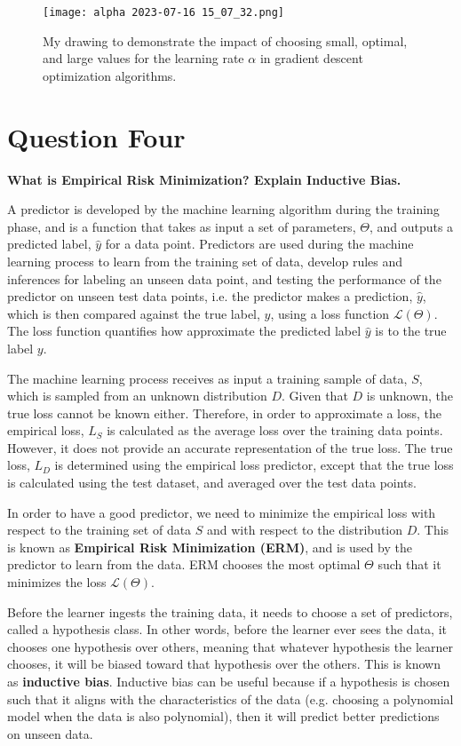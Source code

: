\documentclass{article}
\begin{document}
\begin{figure}
    \centering
    \texttt{[image: alpha 2023-07-16 15\_07\_32.png]}
    \caption{My drawing to demonstrate the impact of choosing small, optimal, and large values for the learning rate $\alpha$ in gradient descent optimization algorithms.}
    \label{alpha}
\end{figure}

\section{Question Four}
\noindent \textbf{What is Empirical Risk Minimization? Explain Inductive Bias.}

A predictor is developed by the machine learning algorithm during the training phase, and is a function that takes as input a set of parameters, $\Theta$, and outputs a predicted label, $\hat{y}$ for a data point. Predictors are used during the machine learning process to learn from the training set of data, develop rules and inferences for labeling an unseen data point, and testing the performance of the predictor on unseen test data points, i.e. the predictor makes a prediction, $\hat{y}$, which is then compared against the true label, $y$, using a loss function $\mathscr{L}(\Theta)$. The loss function quantifies how approximate the predicted label $\hat{y}$ is to the true label $y$.

The machine learning process receives as input a training sample of data, $S$, which is sampled from an unknown distribution $D$. Given that $D$ is unknown, the true loss cannot be known either. Therefore, in order to approximate a loss, the empirical loss, $L_S$ is calculated as the average loss over the training data points. However, it does not provide an accurate representation of the true loss. The true loss, $L_D$ is determined using the empirical loss predictor, except that the true loss is calculated using the test dataset, and averaged over the test data points. 

In order to have a good predictor, we need to minimize the empirical loss with respect to the training set of data $S$ and with respect to the distribution $D$. This is known as \textbf{Empirical Risk Minimization (ERM)}, and is used by the predictor to learn from the data. ERM chooses the most optimal $\Theta$ such that it minimizes the loss $\mathscr{L}(\Theta)$.

Before the learner ingests the training data, it needs to choose a set of predictors, called a hypothesis class. In other words, before the learner ever sees the data, it chooses one hypothesis over others, meaning that whatever hypothesis the learner chooses, it will be biased toward that hypothesis over the others. This is known as \textbf{inductive bias}. Inductive bias can be useful because if a hypothesis is chosen such that it aligns with the characteristics of the data (e.g. choosing a polynomial model when the data is also polynomial), then it will predict better predictions on unseen data.
\end{document}
